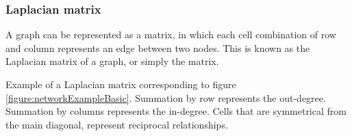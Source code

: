 \subsubsection{Laplacian matrix}

A graph can be represented as a matrix, in which each cell combination of row and column represents an edge between two nodes. This is known as the Laplacian matrix of a graph, or simply the matrix.

\label{table:networkLaplacian}
\begin{table}[h!]

    \centering

    \caption{Example of a Laplacian matrix corresponding to figure \ref{figure:networkExampleBasic}. Summation by row represents the out-degree. Summation by columns represents the in-degree. Cells that are symmetrical from the main diagonal, represent reciprocal relationships.}
    

\end{table}
